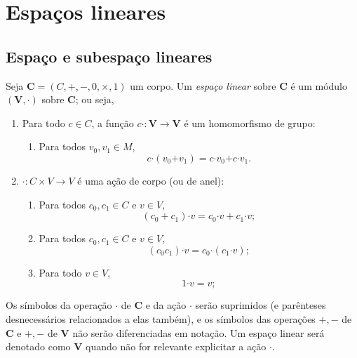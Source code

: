 \chapter{Espaços lineares}

\section{Espaço e subespaço lineares}

\begin{definition}
Seja $\bm C=(C,+,-,0,\times,1)$ um corpo. Um \emph{espaço linear} sobre $\bm C$ é um módulo $(\bm V,\bm \cdot)$ sobre $\bm C$; ou seja,
	\begin{enumerate}
	\item  Para todo $c \in C$, a função $c \bm \cdot \colon \bm V \to \bm V$ é um homomorfismo de grupo:
		\begin{enumerate}
		\item Para todos $v_0,v_1 \in M$,
			\begin{equation*}
			c \bm \cdot (v_0 \bm + v_1) = c \bm \cdot v_0 \bm + c \bm \cdot v_1.
			\end{equation*}
		\end{enumerate}
	\item $\bm \cdot \colon C \times V \to V$ é uma ação de corpo (ou de anel):
		\begin{enumerate}
		\item Para todos $c_0,c_1 \in C$ e $v \in V$,
			\begin{equation*}
			(c_0 + c_1) \bm \cdot v = c_0 \bm \cdot v + c_1 \bm \cdot v;
			\end{equation*}
		\item Para todos $c_0,c_1 \in C$ e $v \in V$,
			\begin{equation*}
			(c_0c_1) \bm \cdot v = c_0 \bm \cdot (c_1 \bm \cdot v);
			\end{equation*}
		\item Para todo $v \in V$,
			\begin{equation*}
			1 \bm \cdot v = v;
			\end{equation*}
		\end{enumerate}
	\end{enumerate}
Os símbolos da operação $\cdot$ de $\bm C$ e da ação $\bm \cdot$ serão suprimidos (e parênteses desnecessários relacionados a elas também), e os símbolos das operações $+,-$ de $\bm C$ e $\bm +,\bm -$ de $\bm V$ não serão diferenciadas em notação.
Um espaço linear será denotado como $\bm V$ quando não for relevante explicitar a ação $\bm \cdot$.
\end{definition}

